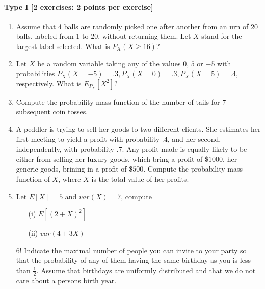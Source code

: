 \documentclass{article}
\begin{document}
\paragraph{Type I [2 exercises: 2 points per exercise]}
\begin{enumerate}
	\item Assume that 4 balls are randomly picked one after another from an urn of 20 balls, labeled from 1 to 20, without returning them. Let $X$ stand for the largest label selected. What is $P_X(X \geq 16)$?
	\item Let $X$ be a random variable taking any of the values $0$, $5$ or $-5$ with probabilities $P_X(X = -5) = .3, P_X(X = 0) = .3, P_X(X = 5) = .4$, respectively. What is $E_{P_X}[X^2]$?
	\item Compute the probability mass function of the number of tails for 7 subsequent coin tosses. 
	\item A peddler is trying to sell her goods to two different clients. She estimates her first meeting to yield a profit with probability $.4$, and her second, independently, with probability $.7$. Any profit made is equally likely to be either from selling her luxury goods, which bring a profit of \$$1000$, her generic goods, brining in a profit of \$$500$. Compute the probability mass function of $X$, where $X$ is the total value of her profits.
	\item Let $E[X] = 5$ and $var(X) = 7$, compute
		\begin{itemize}
			\item[(i)] $E[(2 + X)^2]$
			\item[(ii)] $var(4 + 3X)$
		\end{itemize}
	\item[6!] Indicate the maximal number of people you can invite to your party so that the probability of any of them having the same birthday as you is less than $\frac{1}{2}$. Assume that birthdays are uniformly distributed and that we do not care about a persons birth year. 
\end{enumerate}
\end{document}
